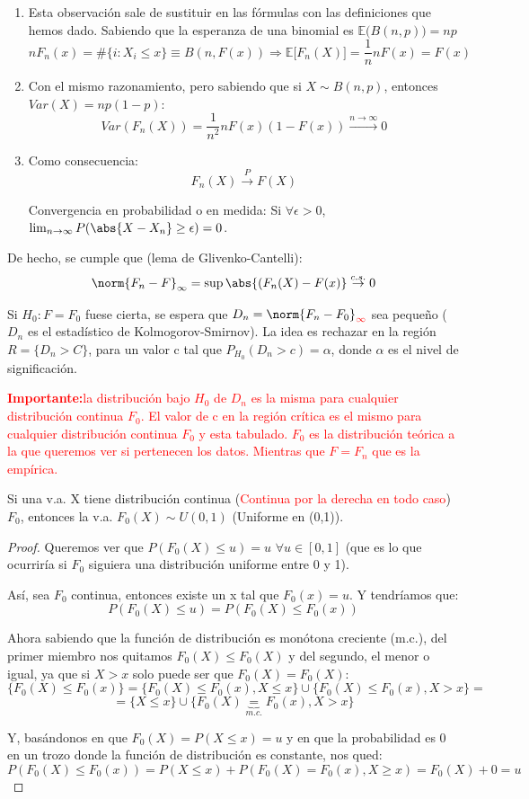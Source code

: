 \documentclass[palatino,nochap]{apuntes}
\begin{document}
\begin{obs}
\begin{enumerate}
\item Esta observación sale de sustituir en las fórmulas con las definiciones que hemos dado. Sabiendo que la esperanza de una binomial es $\mathbb{E}\Big(B(n,p)\Big)=np$ $$nF_n(x) = \#\{i:X_i\leq x \} \equiv B(n, F(x))  \Rightarrow \mathbb{E}\Big[F_n(X)\Big] = \frac{1}{n} n F(x) = F(x)$$
\item Con el mismo razonamiento, pero sabiendo que si $X \sim B(n,p)$, entonces $Var(X)=np(1-p)$:
$$ Var(F_n(X))=\frac{1}{n^2}nF(x)(1-F(x)) \stackrel{n \rightarrow \infty}{\rightarrow} 0$$
\item Como consecuencia:
$$ F_n(X) \stackrel{P}{\rightarrow} F(X)$$

Convergencia en probabilidad o en medida: Si $\forall \epsilon >0$, $\lim_{n \rightarrow \infty}P(\abs{X-X_n}\geq \epsilon)=0$.
\end{enumerate}
\end{obs}
De hecho, se cumple que (lema de Glivenko-Cantelli):
$$\norm{F_n-F}_{\infty} = \sup\abs{(F_n(X)-F(x)} \stackrel{c.s.}{\rightarrow} 0$$

Si $H_0: F=F_0$ fuese cierta, se espera que $D_n = \norm{F_n-F_0}_{\textcolor{red}{\infty}}$ sea pequeño ($D_n$ es el estadístico de Kolmogorov-Smirnov). La idea es rechazar en la región $R=\{D_n > C\}$, para un valor c tal que $P_{H_0}(D_n > c)=\alpha$, donde $\alpha$ es el nivel de significación.

\textcolor{red}{\textbf{Importante:}la distribución bajo $H_0$ de $D_n$ es la misma para cualquier distribución continua $F_0$. El valor de c en la región crítica es el mismo para cualquier distribución continua $F_0$ y esta tabulado. $F_0$ es la distribución teórica a la que queremos ver si pertenecen los datos. Mientras que $F=F_n$ que es la empírica.}

\begin{prop}
Si una v.a. X tiene distribución continua (\textcolor{red}{Continua por la derecha en todo caso}) $F_0$, entonces la v.a. $F_0(X) \sim U(0,1)$ (Uniforme en (0,1)).
\end{prop}
\begin{proof}
Queremos ver que $P(F_0(X)\leq u)=u$ $\forall u \in [0,1]$ (que es lo que ocurriría si $F_0$ siguiera una distribución uniforme entre 0 y 1).

Así, sea $F_0$ continua, entonces existe un x tal que $F_0(x)=u$. Y tendríamos que:
$$ P(F_0(X)\leq u) = P(F_0(X)\leq F_0(x)) $$

Ahora sabiendo que la función de distribución es monótona creciente (m.c.), del primer miembro nos quitamos $F_0(X)\leq F_0(X)$ y del segundo, el menor o igual, ya que si $X>x$ solo puede ser que $F_0(X)= F_0(X)$:
$$\{ F_0(X)\leq F_0(x) \} = \{ F_0(X)\leq F_0(x), X \leq x\} \cup \{ F_0(X)\leq F_0(x), X > x\} = $$
$$ =  \{ X \leq x\} \cup \{ F_0(X) \underbrace{=}_{m.c.} F_0(x), X > x\}$$

Y, basándonos en que $F_0(X)=P(X \leq x)=u$ y en que la probabilidad es 0 en un trozo donde la función de distribución es constante, nos qued: 
$$P(F_0(X)\leq F_0(x)) = P(X \leq x) + P(F_0(X) = F_0(x), X \geq x) = F_0(X) + 0 = u$$
\end{proof}
\end{document}
